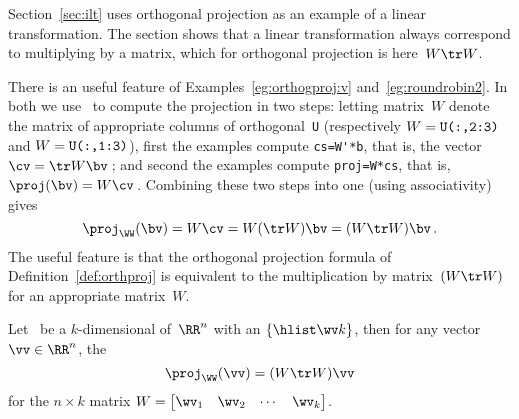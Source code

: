 \begin{aside}
Section~\ref{sec:ilt} uses orthogonal projection as an example of a linear transformation. 
The section shows that a linear transformation always correspond to multiplying by a matrix, which for orthogonal projection is here~\(W\tr W\).
\end{aside}
There is an useful feature of Examples~\ref{eg:orthogproj:v} and~\ref{eg:roundrobin2}.
In both we use \script\ to compute the projection in two steps: 
letting matrix~\(W\) denote the matrix of appropriate columns of orthogonal~\verb|U| (respectively \(W=\verb|U(:,2:3)|\) and \(W=\verb|U(:,1:3)|\)), first the examples compute \verb|cs=W'*b|, that is, the vector \(\cv=\tr W\bv\)\,; and second the examples compute \verb|proj=W*cs|, that is, \(\proj(\bv)=W\cv\)\,.
Combining these two steps into one (using associativity) gives
\begin{equation*}
\proj_\WW(\bv)=W\cv=W(\tr W)\bv=(W\tr W)\bv\,.
\end{equation*}
The useful feature is that the orthogonal projection formula of Definition~\ref{def:orthproj} is equivalent to the multiplication by matrix~\((W\tr W)\) for an appropriate matrix~\(W\).



\begin{theorem} \label{thm:projmat}
Let \WW\ be a \(k\)-dimensional  of~\(\RR^n\) with an  \(\{\hlist\wv k\}\), then for any vector \(\vv\in\RR^n\), the 
\begin{equation}
\proj_\WW(\vv)=(W\tr W)\vv
\end{equation}
for the \(n\times k\) matrix \(W=\begin{bmatrix} \wv_1&\wv_2&\cdots&\wv_k \end{bmatrix}\).
\end{theorem}

